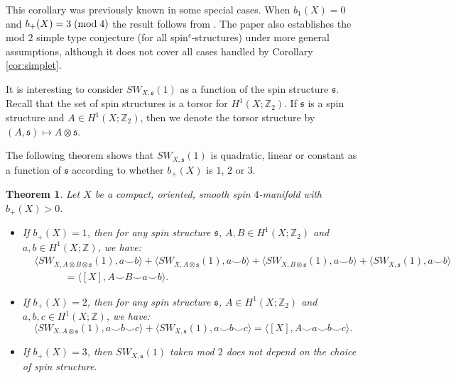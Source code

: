 \documentclass{amsart}
\newtheorem{theorem}{Theorem}[section]
\theoremstyle{definition}
\theoremstyle{remark}
\numberwithin{equation}{section}
\begin{document}
This corollary was previously known in some special cases. When $b_1(X) = 0$ and $b_+(X) = 3 \; ({\rm mod} \; 4)$ the result follows from \cite[Corollary 3.6, Theorem 3.7]{bf}. The paper \cite{kny} also establishes the mod $2$ simple type conjecture (for all spin$^c$-structures) under more general assumptions, although it does not cover all cases handled by Corollary \ref{cor:simplet}.


It is interesting to consider $SW_{X , \mathfrak{s}}(1)$ as a function of the spin structure $\mathfrak{s}$. Recall that the set of spin structures is a torsor for $H^1(X ; \mathbb{Z}_2)$. If $\mathfrak{s}$ is a spin structure and $A \in H^1(X ; \mathbb{Z}_2)$, then we denote the torsor structure by $(A , \mathfrak{s}) \mapsto A \otimes \mathfrak{s}$.

The following theorem shows that $SW_{X,\mathfrak{s}}(1)$ is quadratic, linear or constant as a function of $\mathfrak{s}$ according to whether $b_+(X)$ is $1$, $2$ or $3$.

\begin{theorem}\label{thm:thm2}
Let $X$ be a compact, oriented, smooth spin $4$-manifold with $b_+(X) > 0$. 
\begin{itemize}
\item[(1)]{If $b_+(X) = 1$, then for any spin structure $\mathfrak{s}$, $A,B \in H^1(X ; \mathbb{Z}_2)$ and $a,b \in H^1(X ; \mathbb{Z})$, we have:
\begin{align*}
& \langle SW_{X , A \otimes B \otimes \mathfrak{s}}(1) , a \smallsmile b \rangle + \langle SW_{X , A \otimes \mathfrak{s}}(1) , a \smallsmile b \rangle + \langle SW_{X , B \otimes \mathfrak{s}}(1) , a \smallsmile b \rangle + \langle SW_{X , \mathfrak{s}}(1) , a \smallsmile b \rangle \\
& \quad \quad \quad  = \langle [X] , A \smallsmile B \smallsmile a \smallsmile b \rangle.
\end{align*}
}
\item[(2)]{If $b_+(X) = 2$, then for any spin structure $\mathfrak{s}$, $A \in H^1(X ; \mathbb{Z}_2)$ and $a,b,c \in H^1(X ; \mathbb{Z})$, we have:
\[
\langle SW_{X , A \otimes \mathfrak{s}}(1) , a \smallsmile b \smallsmile c \rangle + \langle SW_{X , \mathfrak{s}}(1) , a \smallsmile b \smallsmile c \rangle  = \langle [X] , A \smallsmile a \smallsmile b \smallsmile c \rangle.
\]
}
\item[(3)]{If $b_+(X) = 3$, then $SW_{X,\mathfrak{s}}(1)$ taken mod $2$ does not depend on the choice of spin structure.}
\end{itemize}
\end{theorem}
\end{document}
